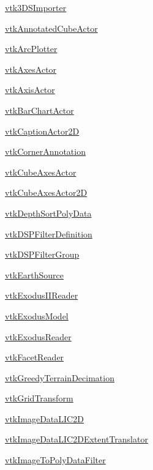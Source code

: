 
\begin{DoxyItemize}
\item \hyperlink{vtkhybrid_vtk3dsimporter}{vtk3\-D\-S\-Importer}  
\item \hyperlink{vtkhybrid_vtkannotatedcubeactor}{vtk\-Annotated\-Cube\-Actor}  
\item \hyperlink{vtkhybrid_vtkarcplotter}{vtk\-Arc\-Plotter}  
\item \hyperlink{vtkhybrid_vtkaxesactor}{vtk\-Axes\-Actor}  
\item \hyperlink{vtkhybrid_vtkaxisactor}{vtk\-Axis\-Actor}  
\item \hyperlink{vtkhybrid_vtkbarchartactor}{vtk\-Bar\-Chart\-Actor}  
\item \hyperlink{vtkhybrid_vtkcaptionactor2d}{vtk\-Caption\-Actor2\-D}  
\item \hyperlink{vtkhybrid_vtkcornerannotation}{vtk\-Corner\-Annotation}  
\item \hyperlink{vtkhybrid_vtkcubeaxesactor}{vtk\-Cube\-Axes\-Actor}  
\item \hyperlink{vtkhybrid_vtkcubeaxesactor2d}{vtk\-Cube\-Axes\-Actor2\-D}  
\item \hyperlink{vtkhybrid_vtkdepthsortpolydata}{vtk\-Depth\-Sort\-Poly\-Data}  
\item \hyperlink{vtkhybrid_vtkdspfilterdefinition}{vtk\-D\-S\-P\-Filter\-Definition}  
\item \hyperlink{vtkhybrid_vtkdspfiltergroup}{vtk\-D\-S\-P\-Filter\-Group}  
\item \hyperlink{vtkhybrid_vtkearthsource}{vtk\-Earth\-Source}  
\item \hyperlink{vtkhybrid_vtkexodusiireader}{vtk\-Exodus\-I\-I\-Reader}  
\item \hyperlink{vtkhybrid_vtkexodusmodel}{vtk\-Exodus\-Model}  
\item \hyperlink{vtkhybrid_vtkexodusreader}{vtk\-Exodus\-Reader}  
\item \hyperlink{vtkhybrid_vtkfacetreader}{vtk\-Facet\-Reader}  
\item \hyperlink{vtkhybrid_vtkgreedyterraindecimation}{vtk\-Greedy\-Terrain\-Decimation}  
\item \hyperlink{vtkhybrid_vtkgridtransform}{vtk\-Grid\-Transform}  
\item \hyperlink{vtkhybrid_vtkimagedatalic2d}{vtk\-Image\-Data\-L\-I\-C2\-D}  
\item \hyperlink{vtkhybrid_vtkimagedatalic2dextenttranslator}{vtk\-Image\-Data\-L\-I\-C2\-D\-Extent\-Translator}  
\item \hyperlink{vtkhybrid_vtkimagetopolydatafilter}{vtk\-Image\-To\-Poly\-Data\-Filter}  

\end{DoxyItemize}
